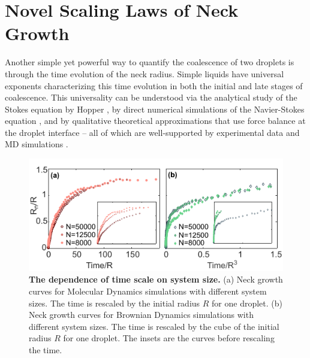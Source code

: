 \documentclass[%
reprint,
amsmath,amssymb,
aps,
]{revtex4-2}
\begin{document}
	\section{Novel Scaling Laws of Neck Growth}
	\label{sec:scale}
	Another simple yet powerful way to quantify the coalescence of two droplets is through the time evolution of the neck radius. Simple liquids have universal exponents characterizing this time evolution in both the initial and late stages of coalescence. This universality can be understood via the analytical study of the Stokes equation by Hopper \cite{hopperCoalescenceTwoViscous1993, eggersCoalescenceLiquidDrops1999a}, by direct numerical simulations of the Navier-Stokes equation \cite{menchaca2001coalescence,anthony2020coalescence}, and by qualitative theoretical approximations that use force balance at the droplet interface \cite{eggersCoalescenceLiquidDrops1999a} -- all of which are well-supported by experimental data \cite{wu2004scaling, paulsenViscousInertialCrossover2011, paulsenInexorableResistanceInertia2012a,paulsen2013pre, paulsenCoalescenceBubblesDrops2014} and MD simulations  \cite{perumantath2019MD, pothier2012molecular}. 
	\begin{figure}[ht]
		\centering
		\includegraphics[width=\columnwidth]{Figure7.pdf}
		\caption{\textbf{The dependence of time scale on system size.} (a) Neck growth curves for Molecular Dynamics simulations with different system sizes. The time is rescaled by the initial radius $R$ for one droplet. (b) Neck growth curves for Brownian Dynamics simulations with different system sizes. The time is rescaled by the cube of the initial radius $R$ for one droplet. The insets are the curves before rescaling the time.}
		\label{fig:systemsize}
	\end{figure}
	
\end{document}
